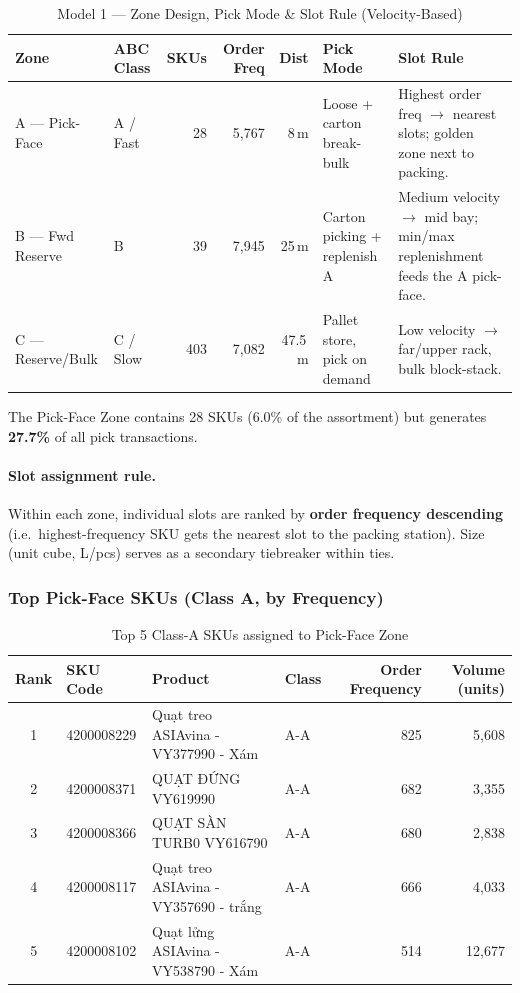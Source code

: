\documentclass[11pt]{article}
\begin{document}
\begin{table}[H]
\centering
\caption{Model 1 --- Zone Design, Pick Mode \& Slot Rule (Velocity-Based)}
\small
\begin{tabular}{l l r r r >{\raggedright\arraybackslash}p{2.6cm} >{\raggedright\arraybackslash}p{4.2cm}}
\toprule
Zone & ABC Class & SKUs & Order Freq & Dist & Pick Mode & Slot Rule \\
\midrule
        A --- Pick-Face & A / Fast & 28 & 5,767 & 8\,m & Loose + carton break-bulk & Highest order freq $\rightarrow$ nearest slots; golden zone next to packing. \\
        \addlinespace
        B --- Fwd Reserve & B & 39 & 7,945 & 25\,m & Carton picking + replenish A & Medium velocity $\rightarrow$ mid bay; min/max replenishment feeds the A pick-face. \\
        \addlinespace
        C --- Reserve/Bulk & C / Slow & 403 & 7,082 & 47.5\,m & Pallet store, pick on demand & Low velocity $\rightarrow$ far/upper rack, bulk block-stack. \\
\bottomrule
\end{tabular}
\end{table}

The Pick-Face Zone contains 28 SKUs (6.0\% of the assortment) but generates
\textbf{27.7\%} of all pick transactions.

\paragraph{Slot assignment rule.}
Within each zone, individual slots are ranked by \textbf{order frequency descending}
(i.e.\ highest-frequency SKU gets the nearest slot to the packing station).
Size (unit cube, L/pcs) serves as a secondary tiebreaker within ties.

\subsubsection{Top Pick-Face SKUs (Class A, by Frequency)}\label{top-a}

\begin{table}[H]
\centering
\caption{Top 5 Class-A SKUs assigned to Pick-Face Zone}
\begin{tabular}{clllrr}
\toprule
Rank & SKU Code & Product & Class & Order Frequency & Volume (units) \\
\midrule
        1 & 4200008229 & Quạt treo ASIAvina - VY377990 - Xám & A-A & 825 & 5,608 \\
        2 & 4200008371 & QUẠT ĐỨNG VY619990 & A-A & 682 & 3,355 \\
        3 & 4200008366 & QUẠT SÀN TURB0 VY616790 & A-A & 680 & 2,838 \\
        4 & 4200008117 & Quạt treo ASIAvina - VY357690 - trắng & A-A & 666 & 4,033 \\
        5 & 4200008102 & Quạt lửng ASIAvina - VY538790 - Xám & A-A & 514 & 12,677 \\
\bottomrule
\end{tabular}
\end{table}
\end{document}
